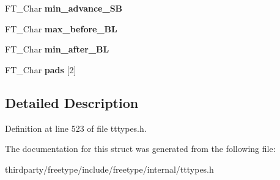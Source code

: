 \begin{DoxyCompactItemize}
\item 
\mbox{\label{struct_t_t___s_bit___line_metrics_rec___ad4f4578a99ce4537bd454bf47a60074c}} 
F\+T\+\_\+\+Char {\bfseries min\+\_\+advance\+\_\+\+SB}
\item 
\mbox{\label{struct_t_t___s_bit___line_metrics_rec___a63599b9adfc64d1927b6a8b46d9ce08d}} 
F\+T\+\_\+\+Char {\bfseries max\+\_\+before\+\_\+\+BL}
\item 
\mbox{\label{struct_t_t___s_bit___line_metrics_rec___a553dfe17d98fd138430545f4f77195c5}} 
F\+T\+\_\+\+Char {\bfseries min\+\_\+after\+\_\+\+BL}
\item 
\mbox{\label{struct_t_t___s_bit___line_metrics_rec___a9f98e5de39f252b6ebfb3e94120d1dbc}} 
F\+T\+\_\+\+Char {\bfseries pads} \mbox{[}2\mbox{]}
\end{DoxyCompactItemize}


\subsection{Detailed Description}


Definition at line 523 of file tttypes.\+h.



The documentation for this struct was generated from the following file\+:\begin{DoxyCompactItemize}
\item 
thirdparty/freetype/include/freetype/internal/tttypes.\+h\end{DoxyCompactItemize}
